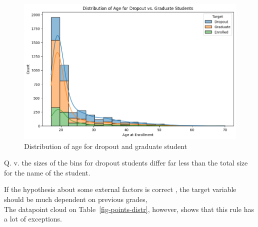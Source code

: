 \documentclass[
  letterpaper,
  DIV=11,
  numbers=noendperiod]{scrartcl}
\begin{document}
\begin{figure}

{\centering \includegraphics{report_AzadhdhinNedalYunisAlFraijat_files/figure-pdf/fig-age-distr-output-1.png}

}

\caption{\label{fig-age-distr}Distribution of age for dropout and
graduate student}

\end{figure}

Q. v. the sizes of the bins for dropout students differ far less than
the total size for the name of the student.

If the hypothesis about some external factors is correct , the target
variable should be much dependent on previous grades,\\
The datapoint cloud on Table~\ref{fig-points-distr}, however, shows that
this rule has a lot of exceptions.
\end{document}
